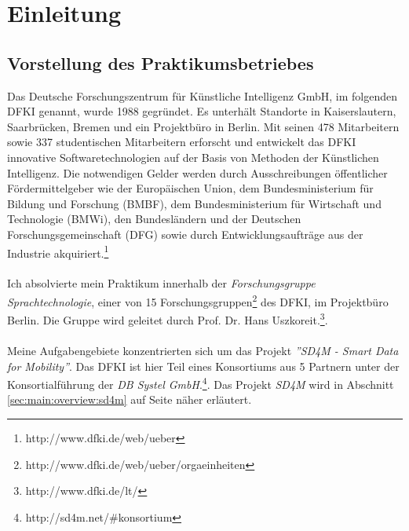 \chapter{Einleitung}
\label{sec:intro}
\section{Vorstellung des Praktikumsbetriebes}
\label{sec:intro:dfki}
Das Deutsche Forschungszentrum für Künstliche Intelligenz GmbH, im folgenden DFKI genannt, wurde 1988 gegründet.
Es unterhält Standorte in Kaiserslautern, Saarbrücken, Bremen und ein Projektbüro in Berlin.
Mit seinen 478 Mitarbeitern sowie 337 studentischen Mitarbeitern erforscht und entwickelt das DFKI innovative Softwaretechnologien auf der Basis von Methoden der Künstlichen Intelligenz.
Die notwendigen Gelder werden durch Ausschreibungen öffentlicher Fördermittelgeber wie der Europäischen Union, dem Bundesministerium für Bildung und Forschung (BMBF), dem Bundesministerium für Wirtschaft und Technologie (BMWi), den Bundesländern und der Deutschen Forschungsgemeinschaft (DFG) sowie durch Entwicklungsaufträge aus der Industrie akquiriert.\footnote{http://www.dfki.de/web/ueber}
\\\\
Ich absolvierte mein Praktikum innerhalb der \textit{Forschungsgruppe Sprachtechnologie}, einer von 15 Forschungsgruppen\footnote{http://www.dfki.de/web/ueber/orgaeinheiten} des DFKI, im Projektbüro Berlin. Die Gruppe wird geleitet durch Prof. Dr. Hans Uszkoreit.\footnote{http://www.dfki.de/lt/}.
\\\\
Meine Aufgabengebiete konzentrierten sich um das Projekt \textit{''SD4M - Smart Data for Mobility''}. Das DFKI ist hier Teil eines Konsortiums aus 5 Partnern unter der Konsortialführung der \textit{DB Systel GmbH}.\footnote{http://sd4m.net/#konsortium}. 
Das Projekt \textit{SD4M} wird in Abschnitt \ref{sec:main:overview:sd4m} auf Seite \pageref{sec:main:overview:sd4m} näher erläutert.
